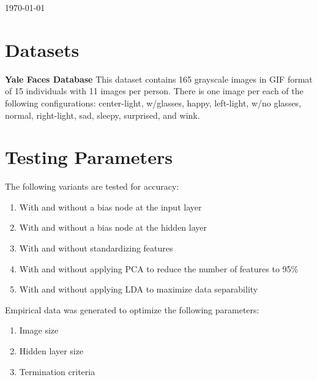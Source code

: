 \documentclass[12pt]{article}
\begin{document}
\begin{titlepage}

{\large \today}\\[3cm] %




\vfill %
\end{titlepage}

\newpage

\section{Datasets}
\textbf{Yale Faces Database} \quad This dataset contains 165 grayscale images in GIF format of 15 individuals with 11 images per person. There is one image per each of the following configurations: center-light, w/glasses, happy, left-light, w/no glasses, normal, right-light, sad, sleepy, surprised, and wink.

\section{Testing Parameters}
The following variants are tested for accuracy:
\begin{enumerate}
  \item With and without a bias node at the input layer
  \item With and without a bias node at the hidden layer
  \item With and without standardizing features
  \item With and without applying PCA to reduce the number of features to 95\%
  \item With and without applying LDA to maximize data separability
\end{enumerate}
Empirical data was generated to optimize the following parameters:
\begin{enumerate}
  \item Image size
  \item Hidden layer size
  \item Termination criteria
\end{enumerate}
\end{document}
